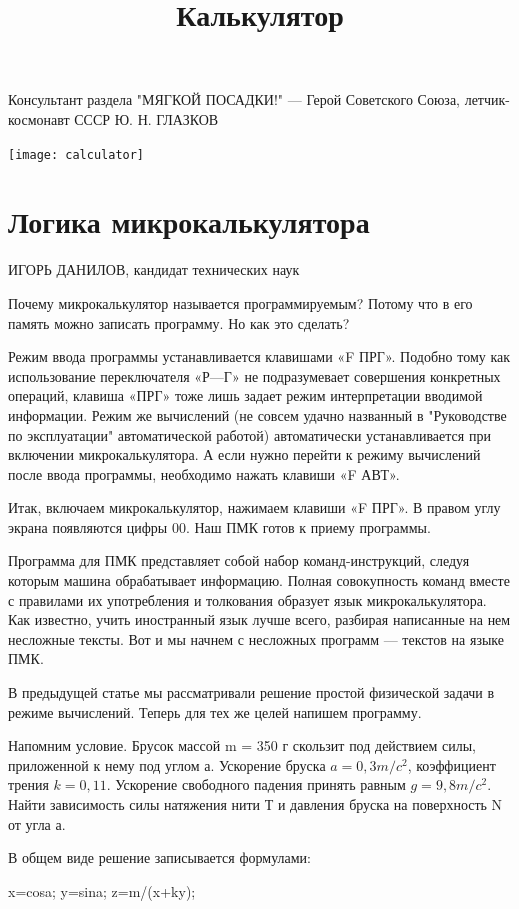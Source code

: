 \documentclass[11pt,a4paper,oneside]{article}
\title{Калькулятор}
\begin{document}
\maketitle
\tableofcontents

Консультант раздела "МЯГКОЙ ПОСАДКИ!" — Герой Советского Союза, летчик-космонавт СССР
Ю. Н. ГЛАЗКОВ
\pagebreak

\texttt{[image: calculator]}
\section{Логика микрокалькулятора}
ИГОРЬ ДАНИЛОВ, кандидат технических наук

Почему микрокалькулятор называется программируемым? Потому что в его память можно записать программу. Но как это сделать?

Режим ввода программы устанавливается клавишами «F ПРГ». Подобно тому как использование переключателя «Р—Г» не подразумевает совершения конкретных операций, клавиша «ПРГ» тоже лишь задает режим интерпретации вводимой информации. Режим же вычислений (не совсем удачно названный в "Руководстве по эксплуатации" автоматической работой) автоматически устанавливается при включении микрокалькулятора. А если нужно перейти к режиму вычислений после ввода программы, необходимо нажать клавиши «F АВТ».

Итак, включаем микрокалькулятор, нажимаем клавиши «F ПРГ». В правом углу экрана появляются цифры 00. Наш ПМК готов к приему программы.

Программа для ПМК представляет собой набор команд-инструкций, следуя которым машина обрабатывает информацию. Полная совокупность команд вместе с правилами их употребления и толкования образует язык микрокалькулятора. Как известно, учить иностранный язык лучше всего, разбирая написанные на нем несложные тексты. Вот и мы начнем с несложных программ — текстов на языке ПМК.

В предыдущей статье мы рассматривали решение простой физической задачи в режиме вычислений. Теперь для тех же целей напишем программу.

Напомним условие. Брусок массой m = 350 г скользит под действием силы, приложенной к нему под углом а. Ускорение бруска $a=0,3 m/c^{2}$, коэффициент трения $k=0,11$. Ускорение свободного падения принять равным $g=9,8 m/c^{2}$. Найти зависимость силы натяжения нити Т и давления бруска на поверхность N от угла а.

В общем виде решение записывается формулами:

x=cosa; y=sina; z=m/(x+ky);
\end{document}
